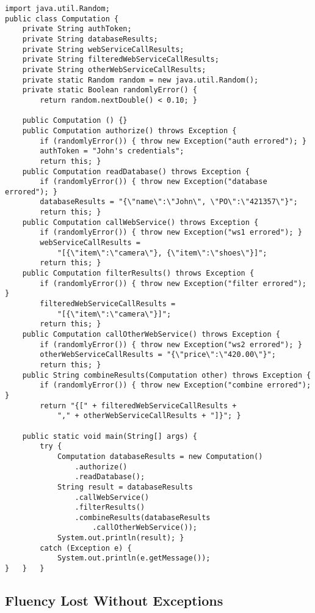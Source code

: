 \documentclass[11pt]{article}
\begin{document}
\begin{verbatim}
import java.util.Random;
public class Computation {
    private String authToken;
    private String databaseResults;
    private String webServiceCallResults;
    private String filteredWebServiceCallResults;
    private String otherWebServiceCallResults;
    private static Random random = new java.util.Random();
    private static Boolean randomlyError() {
        return random.nextDouble() < 0.10; }

    public Computation () {}
    public Computation authorize() throws Exception {
        if (randomlyError()) { throw new Exception("auth errored"); }
        authToken = "John's credentials";
        return this; }
    public Computation readDatabase() throws Exception {
        if (randomlyError()) { throw new Exception("database errored"); }
        databaseResults = "{\"name\":\"John\", \"PO\":\"421357\"}";
        return this; }
    public Computation callWebService() throws Exception {
        if (randomlyError()) { throw new Exception("ws1 errored"); }
        webServiceCallResults =
            "[{\"item\":\"camera\"}, {\"item\":\"shoes\"}]";
        return this; }
    public Computation filterResults() throws Exception {
        if (randomlyError()) { throw new Exception("filter errored"); }
        filteredWebServiceCallResults =
            "[{\"item\":\"camera\"}]";
        return this; }
    public Computation callOtherWebService() throws Exception {
        if (randomlyError()) { throw new Exception("ws2 errored"); }
        otherWebServiceCallResults = "{\"price\":\"420.00\"}";
        return this; }
    public String combineResults(Computation other) throws Exception {
        if (randomlyError()) { throw new Exception("combine errored"); }
        return "{[" + filteredWebServiceCallResults +
            "," + otherWebServiceCallResults + "]}"; }

    public static void main(String[] args) {
        try {
            Computation databaseResults = new Computation()
                .authorize()
                .readDatabase();
            String result = databaseResults
                .callWebService()
                .filterResults()
                .combineResults(databaseResults
                    .callOtherWebService());
            System.out.println(result); }
        catch (Exception e) {
            System.out.println(e.getMessage());
}   }   }
\end{verbatim}
\subsection{Fluency Lost Without Exceptions}
\label{sec-2-3}
\end{document}
